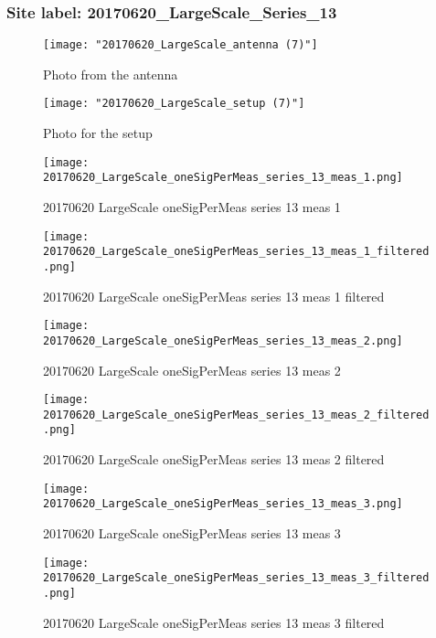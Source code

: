 \subsubsection{Site label: 20170620\_LargeScale\_Series\_13}
\begin{figure}[ht] \caption{Photo from the antenna}
\texttt{[image: "20170620\_LargeScale\_antenna (7)"]}\centering\end{figure}
\begin{figure}[ht] \caption{Photo for the setup}
\texttt{[image: "20170620\_LargeScale\_setup (7)"]}\centering\end{figure}
\begin{figure}[ht] \caption{20170620 LargeScale oneSigPerMeas series 13 meas 1}
\texttt{[image: 20170620\_LargeScale\_oneSigPerMeas\_series\_13\_meas\_1.png]}\centering\end{figure}
\begin{figure}[ht] \caption{20170620 LargeScale oneSigPerMeas series 13 meas 1 filtered}
\texttt{[image: 20170620\_LargeScale\_oneSigPerMeas\_series\_13\_meas\_1\_filtered.png]}\centering\end{figure}
\begin{figure}[ht] \caption{20170620 LargeScale oneSigPerMeas series 13 meas 2}
\texttt{[image: 20170620\_LargeScale\_oneSigPerMeas\_series\_13\_meas\_2.png]}\centering\end{figure}
\begin{figure}[ht] \caption{20170620 LargeScale oneSigPerMeas series 13 meas 2 filtered}
\texttt{[image: 20170620\_LargeScale\_oneSigPerMeas\_series\_13\_meas\_2\_filtered.png]}\centering\end{figure}
\begin{figure}[ht] \caption{20170620 LargeScale oneSigPerMeas series 13 meas 3}
\texttt{[image: 20170620\_LargeScale\_oneSigPerMeas\_series\_13\_meas\_3.png]}\centering\end{figure}
\begin{figure}[ht] \caption{20170620 LargeScale oneSigPerMeas series 13 meas 3 filtered}
\texttt{[image: 20170620\_LargeScale\_oneSigPerMeas\_series\_13\_meas\_3\_filtered.png]}\centering\end{figure}
\clearpage
